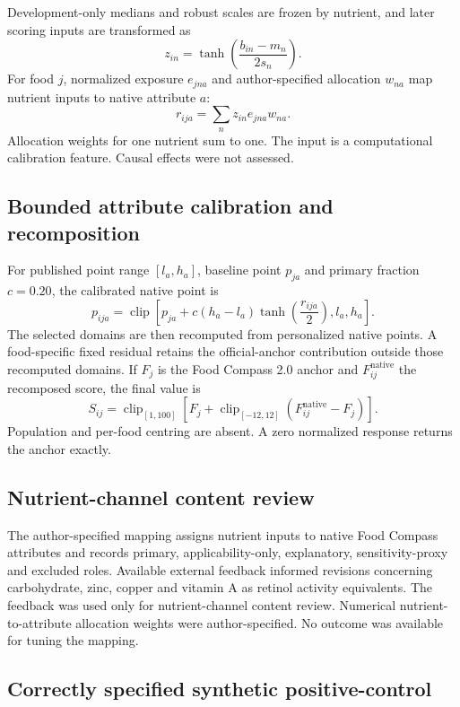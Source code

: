Development-only medians and robust scales are frozen by nutrient, and
later scoring inputs are transformed as
\[
z_{in}=\tanh\!\left(\frac{b_{in}-m_n}{2s_n}\right).
\]
For food \(j\), normalized exposure \(e_{jna}\) and author-specified allocation
\(w_{na}\) map nutrient inputs to native attribute \(a\):
\[
r_{ija}=\sum_n z_{in}e_{jna}w_{na}.
\]
Allocation weights for one nutrient sum to one. The input is a computational calibration feature. Causal effects were not assessed.

\subsection*{Bounded attribute calibration and recomposition}

For published point range \([l_a,h_a]\), baseline point \(p_{ja}\) and primary
fraction \(c=0.20\), the calibrated native point is
\[
p_{ija}=\operatorname{clip}\!\left[
p_{ja}+c(h_a-l_a)\tanh\!\left(\frac{r_{ija}}{2}\right),l_a,h_a\right].
\]
The selected domains are then recomputed from personalized native points. A
food-specific fixed residual retains the official-anchor contribution outside
those recomputed domains. If \(F_j\) is the Food Compass 2.0 anchor and
\(F^{\mathrm{native}}_{ij}\) the recomposed score, the final value is
\[
S_{ij}=\operatorname{clip}_{[1,100]}\!\left[
F_j+\operatorname{clip}_{[-12,12]}
\left(F^{\mathrm{native}}_{ij}-F_j\right)\right].
\]
Population and per-food centring are absent. A zero normalized response
returns the anchor exactly.

\subsection*{Nutrient-channel content review}

The author-specified mapping assigns nutrient inputs to native Food Compass attributes
and records primary, applicability-only, explanatory, sensitivity-proxy and
excluded roles. Available external feedback informed revisions concerning
carbohydrate, zinc, copper and vitamin A as retinol activity equivalents. The
feedback was used only for nutrient-channel content review. Numerical
nutrient-to-attribute allocation weights were author-specified. No outcome was
available for tuning the mapping.

\subsection*{Correctly specified synthetic positive-control}

